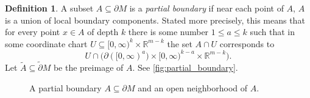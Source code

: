 \documentclass[11pt]{amsart}
\newtheorem{prop}{Proposition}[section]
\newtheorem{lem}{Lemma}[section]
\theoremstyle{definition}
\newtheorem{defn}{Definition}[section]
\numberwithin{equation}{section}
\numberwithin{figure}{section}
\newcommand{\R}{\mathbb R}
\newcommand{\ti}{\widetilde}
\newcommand{\ourdefn}[1]{{\it #1}}
\begin{document}
\begin{defn}\label{tame_def}
	A subset $A \subseteq \partial M$ is a \ourdefn{partial boundary} if near each point of $A$, $A$ is a union of local boundary components. Stated more precisely, this means that %
	for every point $x \in A$ of depth $k$ there is some number $1\le a\le k$ such that in some coordinate chart $U 		\subseteq [0,\infty)^k \times \R^{m-k}$ the set $A\cap U$ corresponds to 
	\[ U \cap \big(\partial([0,\infty)^a) \times [0,\infty)^{k-a} \times \R^{m-k}\big). \]
	Let $\ti A\subseteq \ti \partial M$ be the preimage of $A$. See \autoref{fig:partial_boundary}.
\end{defn}

\begin{figure}[h]
	\centering
	\def\svgwidth{4.5in}
	
	\vspace{-.5em}
	\caption{A partial boundary $A \subseteq \partial M$ and an open neighborhood of $A$.}\label{fig:partial_boundary}
\end{figure}



\end{document}
